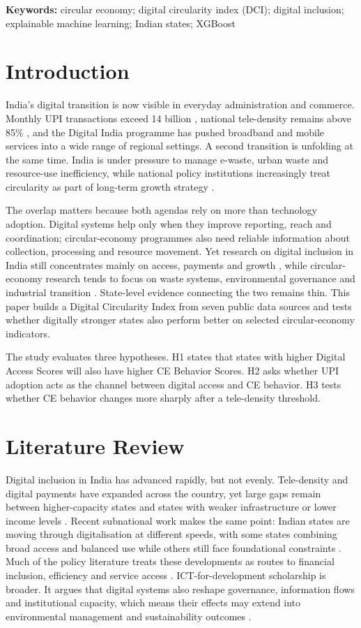 \documentclass[10pt,a4paper]{article}
\begin{document}
\textbf{Keywords:} circular economy; digital circularity index (DCI); digital inclusion; explainable machine learning; Indian states; XGBoost

\section{Introduction}

India's digital transition is now visible in everyday administration and commerce. Monthly UPI transactions exceed 14 billion \citep{npci2025}, national tele-density remains above 85\% \citep{trai2024}, and the Digital India programme has pushed broadband and mobile services into a wide range of regional settings. A second transition is unfolding at the same time. India is under pressure to manage e-waste, urban waste and resource-use inefficiency, while national policy institutions increasingly treat circularity as part of long-term growth strategy \citep{cpcb2023,nitiCE2021}.

The overlap matters because both agendas rely on more than technology adoption. Digital systems help only when they improve reporting, reach and coordination; circular-economy programmes also need reliable information about collection, processing and resource movement. Yet research on digital inclusion in India still concentrates mainly on access, payments and growth \citep{meity2023}, while circular-economy research tends to focus on waste systems, environmental governance and industrial transition \citep{geissdoerfer2017}. State-level evidence connecting the two remains thin. This paper builds a Digital Circularity Index from seven public data sources and tests whether digitally stronger states also perform better on selected circular-economy indicators.

The study evaluates three hypotheses. H1 states that states with higher Digital Access Scores will also have higher CE Behavior Scores. H2 asks whether UPI adoption acts as the channel between digital access and CE behavior. H3 tests whether CE behavior changes more sharply after a tele-density threshold.

\section{Literature Review}

Digital inclusion in India has advanced rapidly, but not evenly. Tele-density and digital payments have expanded across the country, yet large gaps remain between higher-capacity states and states with weaker infrastructure or lower income levels \citep{trai2024,npci2025}. Recent subnational work makes the same point: Indian states are moving through digitalisation at different speeds, with some states combining broad access and balanced use while others still face foundational constraints \citep{icrier2025}. Much of the policy literature treats these developments as routes to financial inclusion, efficiency and service access \citep{meity2023}. ICT-for-development scholarship is broader. It argues that digital systems also reshape governance, information flows and institutional capacity, which means their effects may extend into environmental management and sustainability outcomes \citep{avgerou2010,heeks2017}.
\end{document}
